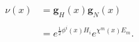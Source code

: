 \begin{equation}
\begin{aligned}
\nu (x)&=\mathbf{g}_{H}(x)\mathbf{g}_{N}(x)\\
\\
&=e^{\frac{1}{2}\phi ^{i}(x)H_{i}}e^{\chi
^{m}(x)E_{m}}.
\end{aligned}
\end{equation}

